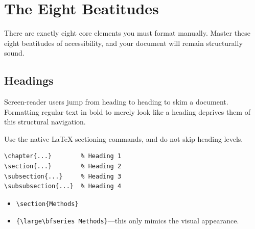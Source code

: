 \section{The Eight Beatitudes}
\label{sec:beatitudes}

There are exactly eight core elements you must format manually. Master these eight beatitudes of accessibility, and your document will remain structurally sound.

\subsection{Headings}
\label{subsec:headings}

 Screen-reader users jump from heading to heading to skim a document. Formatting regular text in bold to merely look like a heading deprives them of this structural navigation.

 Use the native LaTeX sectioning commands, and do not skip heading levels.

\begin{Verbatim}
\chapter{...}        % Heading 1
\section{...}        % Heading 2
\subsection{...}     % Heading 3
\subsubsection{...}  % Heading 4
\end{Verbatim}

\begin{itemize}
  \item {} \verb|\section{Methods}|
  \item {} \verb|{\large\bfseries Methods}|---this only
        mimics the visual appearance.
\end{itemize}

